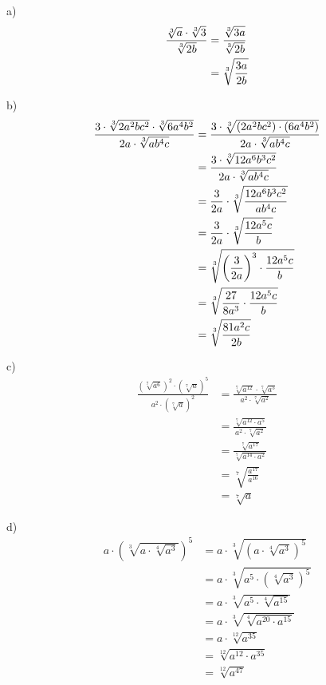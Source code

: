 \begin{solucio}
a)%
\begin{align*}
\frac{\sqrt[3]{a}\cdot \sqrt[3]{3}}{\sqrt[3]{2b}} &=\frac{\sqrt[3]{3a}}{%
\sqrt[3]{2b}} \\
&=\sqrt[3]{\frac{3a}{2b}}
\end{align*}

b)%
\begin{align*}
\frac{3\cdot \sqrt[3]{2a^{2}bc^{2}}\cdot \sqrt[3]{6a^{4}b^{2}}}{2a\cdot \sqrt%
[3]{ab^{4}c}} &=\frac{3\cdot \sqrt[3]{(2a^{2}bc^{2})\cdot (6a^{4}b^{2})}}{%
2a\cdot \sqrt[3]{ab^{4}c}} \\
&=\frac{3\cdot \sqrt[3]{12a^{6}b^{3}c^{2}}}{2a\cdot \sqrt[3]{ab^{4}c}} \\
&=\frac{3}{2a}\cdot \sqrt[3]{\frac{12a^{6}b^{3}c^{2}}{ab^{4}c}} \\
&=\frac{3}{2a}\cdot \sqrt[3]{\frac{12a^{5}c}{b}} \\
&=\sqrt[3]{\left( \frac{3}{2a}\right) ^{3}\cdot \frac{12a^{5}c}{b}} \\
&=\sqrt[3]{\frac{27}{8a^{3}}\cdot \frac{12a^{5}c}{b}} \\
&=\sqrt[3]{\frac{81a^{2}c}{2b}}
\end{align*}

c)%
\begin{align*}
\frac{\left( \sqrt[7]{a^{6}}\right) ^{2}\cdot \left( \sqrt[7]{a}\right) ^{5}%
}{a^{2}\cdot \left( \sqrt[7]{a}\right) ^{2}} &=\frac{\sqrt[7]{a^{12}}\cdot 
\sqrt[7]{a^{5}}}{a^{2}\cdot \sqrt[7]{a^{2}}} \\
&=\frac{\sqrt[7]{a^{12}\cdot a^{5}}}{a^{2}\cdot \sqrt[7]{a^{2}}} \\
&=\frac{\sqrt[7]{a^{17}}}{\sqrt[7]{a^{14}\cdot a^{2}}} \\
&=\sqrt[7]{\frac{a^{17}}{a^{16}}} \\
&=\sqrt[7]{a}
\end{align*}

d)%
\begin{align*}
a\cdot \left( \sqrt[3]{a\cdot \sqrt[4]{a^{3}}}\right) ^{5} &=a\cdot \sqrt[3]%
{\left( a\cdot \sqrt[4]{a^{3}}\right) ^{5}} \\
&=a\cdot \sqrt[3]{a^{5}\cdot \left( \sqrt[4]{a^{3}}\right) ^{5}} \\
&=a\cdot \sqrt[3]{a^{5}\cdot \sqrt[4]{a^{15}}} \\
&=a\cdot \sqrt[3]{\sqrt[4]{a^{20}\cdot a^{15}}} \\
&=a\cdot \sqrt[12]{a^{35}} \\
&=\sqrt[12]{a^{12}\cdot a^{35}} \\
&=\sqrt[12]{a^{47}}
\end{align*}
\end{solucio}


